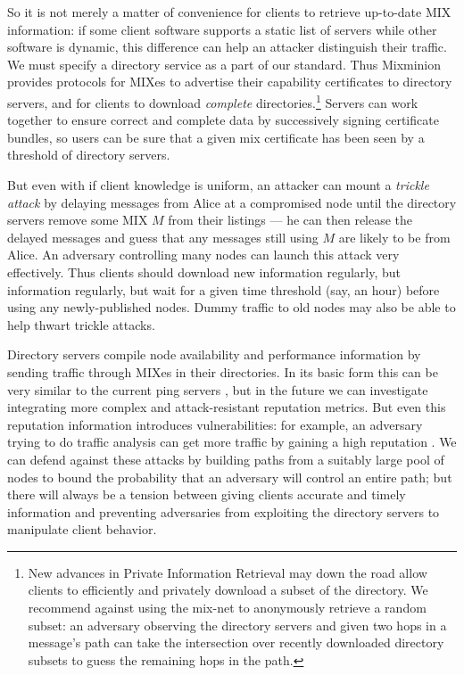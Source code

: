 \documentclass{llncs}
\begin{document}
So it is not merely a matter of convenience for clients to retrieve
up-to-date MIX information: if some client software supports a static
list of servers while other software is dynamic, this difference can
help an attacker distinguish their traffic. We must specify a directory
service as a part of our standard. Thus Mixminion provides protocols for
MIXes to advertise their capability certificates to directory servers,
and for clients to download \emph{complete} directories.\footnote{
  New advances in Private Information Retrieval \cite{malkin-thesis} may down the
  road allow clients to efficiently and privately download a subset of
  the directory. We recommend against using the mix-net to anonymously
  retrieve a random subset: an adversary observing the directory servers
  and given two hops in a message's path can take the intersection over
  recently downloaded directory subsets to guess the remaining hops in
  the path.}
Servers can work together to ensure correct and complete data by
successively signing certificate bundles, so users can be sure that a
given mix certificate has been seen by a threshold of directory servers.

But even with if client knowledge is uniform, an attacker can mount a
\emph{trickle attack} by delaying messages from Alice at a compromised
node until the directory servers remove some MIX $M$ from their listings
--- he can then release the delayed messages and guess that any messages
still using $M$ are likely to be from Alice. An adversary controlling
many nodes can launch this attack very effectively. Thus clients
should download new information regularly, but information regularly,
but wait for a given time threshold (say, an hour) before using any
newly-published nodes. Dummy traffic to old nodes may also be able to
help thwart trickle attacks.

Directory servers compile node availability and performance information by
sending traffic through MIXes in their directories. In its basic form this
can be very similar to the current ping servers \cite{levien}, but in the
future we can investigate integrating more complex and attack-resistant
reputation metrics. But even this reputation information introduces
vulnerabilities: for example, an adversary trying to do traffic analysis
can get more traffic by gaining a high reputation \cite{mix-acc}. We can
defend against these attacks by building paths from a suitably large pool
of nodes \cite{casc-rep} to bound the probability that an adversary will
control an entire path; but there will always be a tension between giving
clients accurate and timely information and preventing adversaries from
exploiting the directory servers to manipulate client behavior.
\end{document}
